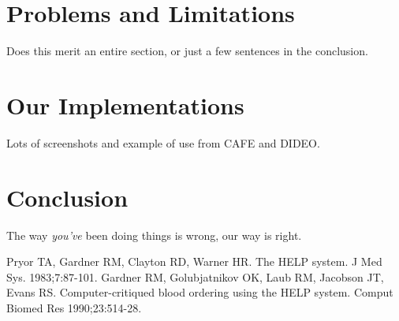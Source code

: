 \documentclass{amia}
\begin{document}
\section*{Problems and Limitations}
Does this merit an entire section, or just a few sentences in the conclusion.

\section*{Our Implementations}
Lots of screenshots and example of use from CAFE and DIDEO.

\section*{Conclusion}
The way \emph{you've} been doing things is wrong, our way is right.

\makeatletter
\renewcommand{\@biblabel}[1]{\hfill #1.}
\makeatother


\begin{thebibliography}{1}
\setlength\itemsep{-0.1em}

Pryor TA, Gardner RM, Clayton RD, Warner HR. The HELP system. J Med Sys. 1983;7:87-101.
Gardner RM, Golubjatnikov OK, Laub RM, Jacobson JT, Evans RS. Computer-critiqued blood ordering using the HELP system. Comput Biomed Res 1990;23:514-28.

\end{thebibliography}
\end{document}
